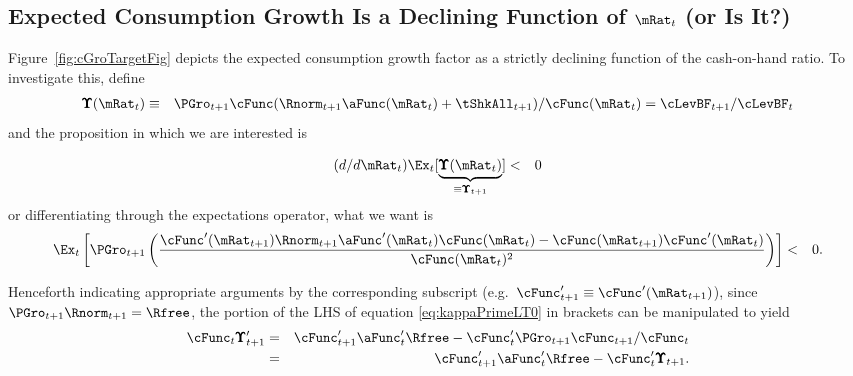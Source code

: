 \documentclass[titlepage]{\econtex}\providecommand{\texname}{BufferStockTheory}
\begin{document}
{\hypertarget{dcgdxneg}{}
\subsection{Expected Consumption Growth Is a Declining Function of $\mRat_{t}$ (or Is It?)}
\label{subsec:dcgdxneg}

Figure~\ref{fig:cGroTargetFig} depicts the expected consumption growth factor as a strictly
declining function of the cash-on-hand ratio. To investigate this,
define
\begin{eqnarray*}
\pmb{\Upsilon}(\mRat_{t}) & \equiv & \PGro_{t+1} \cFunc(\Rnorm_{t+1}\aFunc(\mRat_{t})+\tShkAll_{t+1})/\cFunc(\mRat_{t})  = \cLevBF_{t+1}/\cLevBF_{t}
\end{eqnarray*}
and the proposition in which we are interested is

\begin{eqnarray}
  (d/d\mRat_{t})\Ex_{t}[\underbrace{\pmb{\Upsilon}(\mRat_{t})}_{\equiv \pmb{\Upsilon}_{t+1}}] & < & 0 \label{eq:dChi}  \nonumber
\end{eqnarray}
or differentiating through the expectations operator, what we want is
\begin{eqnarray}
\Ex_{t}\left[\PGro_{t+1} \left(\frac{\cFunc^{\prime}(\mRat_{t+1})\Rnorm_{t+1}\aFunc^{\prime}(\mRat_{t})\cFunc(\mRat_{t})-\cFunc(\mRat_{t+1})\cFunc^{\prime}(\mRat_{t})}{\cFunc(\mRat_{t})^{2}}\right)\right] & < & 0 \label{eq:kappaPrimeLT0}.
\end{eqnarray}

Henceforth indicating appropriate arguments by the corresponding
subscript (e.g.\ $\cFunc_{t+1}^{\prime} \equiv \cFunc^{\prime}(\mRat_{t+1})$), since
$\PGro_{t+1}\Rnorm_{t+1}=\Rfree$, the portion of the LHS of equation \eqref{eq:kappaPrimeLT0} in brackets can be manipulated to yield
\begin{eqnarray}
 \cFunc_{t} \pmb{\Upsilon}^{\prime}_{t+1} & = & \cFunc^{\prime}_{t+1}\aFunc^{\prime}_{t}\Rfree-\cFunc^{\prime}_{t} \PGro_{t+1} \cFunc_{t+1}/\cFunc_{t} \nonumber
\\ & = & \cFunc^{\prime}_{t+1}\aFunc^{\prime}_{t}\Rfree-\cFunc^{\prime}_{t} \pmb{\Upsilon}_{t+1} \label{eq:cPrimek}
.
\end{eqnarray}

}
\end{document}
